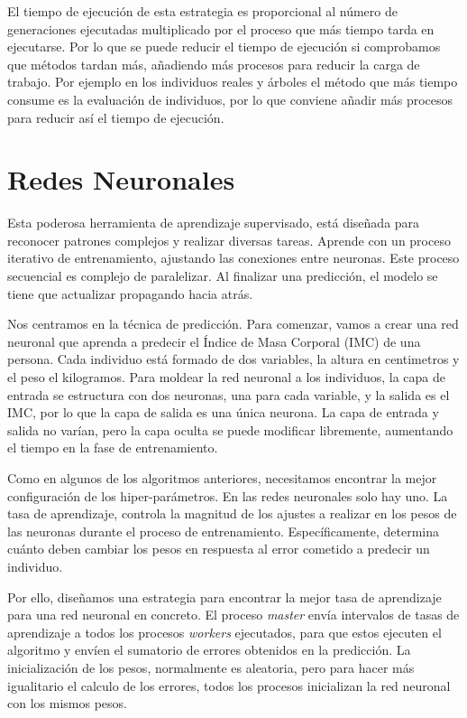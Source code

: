 	El tiempo de ejecución de esta estrategia es proporcional al número de generaciones ejecutadas multiplicado por el proceso que más tiempo tarda en ejecutarse. Por lo que se puede reducir el tiempo de ejecución si comprobamos que métodos tardan más, añadiendo más procesos para reducir la carga de trabajo. Por ejemplo en los individuos reales y árboles el método que más tiempo consume es la evaluación de individuos, por lo que conviene añadir más procesos para reducir así el tiempo de ejecución.
	
	
	
	

\section{Redes Neuronales}
\label{cap:3_5}
	Esta poderosa herramienta de aprendizaje supervisado, está diseñada para reconocer patrones complejos y realizar diversas tareas. Aprende con un proceso iterativo de entrenamiento, ajustando las conexiones entre neuronas. Este proceso secuencial es complejo de paralelizar. Al finalizar una predicción, el modelo se tiene que actualizar propagando hacia atrás.
	
	Nos centramos en la técnica de predicción. Para comenzar, vamos a crear una red neuronal que aprenda a predecir el Índice de Masa Corporal (IMC) de una persona. Cada individuo está formado de dos variables, la altura en centimetros y el peso el kilogramos. Para moldear la red neuronal a los individuos, la capa de entrada se estructura con dos neuronas, una para cada variable, y la salida es el IMC, por lo que la capa de salida es una única neurona. La capa de entrada y salida no varían, pero la capa oculta se puede modificar libremente, aumentando el tiempo en la fase de entrenamiento.
	
	
	Como en algunos de los algoritmos anteriores, necesitamos encontrar la mejor configuración de los hiper-parámetros. En las redes neuronales solo hay uno. La tasa de aprendizaje, controla la magnitud de los ajustes a realizar en los pesos de las neuronas durante el proceso de entrenamiento. Específicamente, determina cuánto deben cambiar los pesos en respuesta al error cometido a predecir un individuo.
	
	
	Por ello, diseñamos una estrategia para encontrar la mejor tasa de aprendizaje para una red neuronal en concreto. El proceso \textit{master} envía intervalos de tasas de aprendizaje a todos los procesos \textit{workers} ejecutados, para que estos ejecuten el algoritmo y envíen el sumatorio de errores obtenidos en la predicción. La inicialización de los pesos, normalmente es aleatoria, pero para hacer más igualitario el calculo de los errores, todos los procesos inicializan la red neuronal con los mismos pesos.
	

